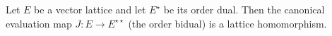 Let $E$ be a vector lattice and let $E^\star$ be its order dual. Then the canonical evaluation map $J : E \to E^{\star\star}$ (the order bidual) is a lattice homomorphism.
